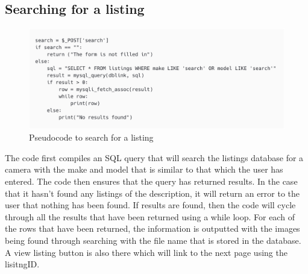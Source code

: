 \subsection{Searching for a listing}
 \begin{figure}[H]
     \centering
     \includegraphics[scale=0.3]{ch2_design/alg_search.png}
     \caption{Pseudocode to search for a listing}
     \label{fig:alg_search}
 \end{figure}
The code first compiles an SQL query that will search the listings database for a camera with the make and model that is similar to that which the user has entered. The code then ensures that the query has returned results. In the case that it hasn’t found any listings of the description, it will return an error to the user that nothing has been found. If results are found, then the code will cycle through all the results that have been returned using a while loop. For each of the rows that have been returned, the information is outputted with the images being found through searching with the file name that is stored in the database. A view listing button is also there which will link to the next page using the lisitngID.


